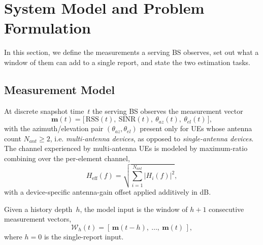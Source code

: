\section{System Model and Problem Formulation}
\label{sec:system-model}

In this section, we define the measurements a serving BS observes, set out what a window of them can add to a single report, and state the two estimation tasks.

\subsection{Measurement Model}
\label{subsec:measurement-model}

At discrete snapshot time~$t$ the serving BS observes the measurement vector
\begin{equation}
  \mathbf{m}(t) = \big[\, \mathrm{RSS}(t),\ \mathrm{SINR}(t),\ \theta_{az}(t),\ \theta_{el}(t) \,\big],
  \label{eq:measurement-vector}
\end{equation}
with the azimuth/elevation pair $(\theta_{az}, \theta_{el})$ present only for UEs whose antenna count $N_{ant} \ge 2$, i.e. \emph{multi-antenna devices}, as opposed to \emph{single-antenna devices}. The channel experienced by multi-antenna UEs is modeled by maximum-ratio combining over the per-element channel,
\begin{equation}
  H_{\text{eff}}(f) = \sqrt{\textstyle\sum_{i=1}^{N_{ant}} \lvert H_i(f) \rvert^2},
  \label{eq:mrc}
\end{equation}
with a device-specific antenna-gain offset applied additively in dB.

Given a history depth~$h$, the model input is the window of $h+1$ consecutive measurement vectors,
\begin{equation}
  \mathcal{W}_h(t) = \left[\, \mathbf{m}(t-h),\ \dots,\ \mathbf{m}(t) \,\right],
  \label{eq:transition-history}
\end{equation}
where $h=0$ is the single-report input. %

